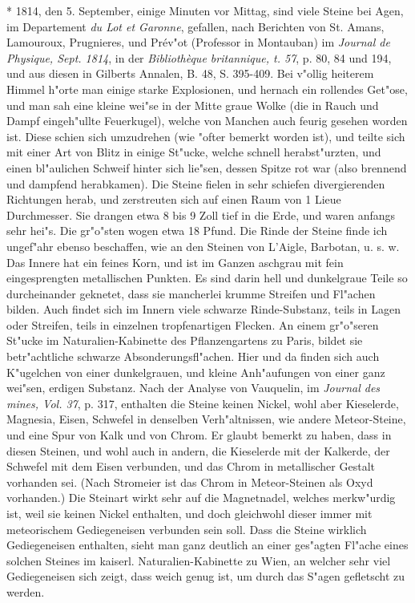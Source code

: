 \documentclass[a4paper, 11pt, oneside, polutonikogreek, german]{article}
\begin{document}
* 1814, den 5. September, einige Minuten vor Mittag, sind viele Steine bei Agen, im Departement \emph{du Lot et Garonne}, gefallen, nach Berichten von St. Amans, Lamouroux, Prugnieres, und Prév"ot (Professor in Montauban) im \emph{Journal de Physique, Sept. 1814}, in der \emph{Bibliothèque britannique, t. 57}, p. 80, 84 und 194, und aus diesen in Gilberts Annalen, B. 48, S. 395-409. Bei v"ollig heiterem Himmel h"orte man einige starke Explosionen, und hernach ein rollendes Get"ose, und man sah eine kleine wei"se in der Mitte graue Wolke (die in Rauch und Dampf eingeh"ullte Feuerkugel), welche von Manchen auch feurig gesehen worden ist. Diese schien sich umzudrehen (wie "ofter bemerkt worden ist), und teilte sich mit einer Art von Blitz in einige St"ucke, welche schnell herabst"urzten, und einen bl"aulichen Schweif hinter sich lie"sen, dessen Spitze rot war (also brennend und dampfend herabkamen). Die Steine fielen in sehr schiefen divergierenden Richtungen herab, und zerstreuten sich auf einen Raum von 1 Lieue Durchmesser. Sie drangen etwa 8 bis 9 Zoll tief in die Erde, und waren anfangs sehr hei"s. Die gr"o"sten wogen etwa 18 Pfund. Die Rinde der Steine finde ich ungef"ahr ebenso beschaffen, wie an den Steinen von L'Aigle, Barbotan, u. s. w. Das Innere hat ein feines Korn, und ist im Ganzen aschgrau mit fein eingesprengten metallischen Punkten. Es sind darin hell und dunkelgraue Teile so durcheinander geknetet, dass sie mancherlei krumme Streifen und Fl"achen bilden. Auch findet sich im Innern viele schwarze Rinde-Substanz, teils in Lagen oder Streifen, teils in einzelnen tropfenartigen Flecken. An einem gr"o"seren St"ucke im Naturalien-Kabinette des Pflanzengartens zu Paris, bildet sie betr"achtliche schwarze Absonderungsfl"achen. Hier und da finden sich auch K"ugelchen von einer dunkelgrauen, und kleine Anh"aufungen von einer ganz wei"sen, erdigen Substanz. Nach der Analyse von Vauquelin, im \emph{Journal des mines, Vol. 37}, p. 317, enthalten die Steine keinen Nickel, wohl aber Kieselerde, Magnesia, Eisen, Schwefel in denselben Verh"altnissen, wie andere Meteor-Steine, und eine Spur von Kalk und von Chrom. Er glaubt bemerkt zu haben, dass in diesen Steinen, und wohl auch in andern, die Kieselerde mit der Kalkerde, der Schwefel mit dem Eisen verbunden, und das Chrom in metallischer Gestalt vorhanden sei. (Nach Stromeier ist das Chrom in Meteor-Steinen als Oxyd vorhanden.) Die Steinart wirkt sehr auf die Magnetnadel, welches merkw"urdig ist, weil sie keinen Nickel enthalten, und doch gleichwohl dieser immer mit meteorischem Gediegeneisen verbunden sein soll. Dass die Steine wirklich Gediegeneisen enthalten, sieht man ganz deutlich an einer ges"agten Fl"ache eines solchen Steines im kaiserl. Naturalien-Kabinette zu Wien, an welcher sehr viel Gediegeneisen sich zeigt, dass weich genug ist, um durch das S"agen gefletscht zu werden.
\end{document}
